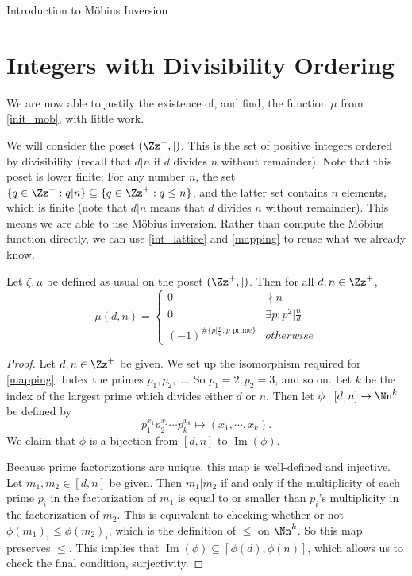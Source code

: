 \documentclass[12pt]{pom_thesis}
\DeclareMathOperator{\im}{Im}
\begin{document}
\begin{chapter}{Introduction to M\"obius Inversion}
\section{Integers with Divisibility Ordering}
We are now able to justify the existence of, and find, the function $\mu$ from \eqref{init_mob}, with little work.

We will consider the poset $(\Zz^{+}, |)$. This is the set of positive integers ordered by divisibility (recall that $d|n$ if $d$ divides $n$ without remainder). Note that this poset is lower finite: For any number $n$, the set $\{q \in \Zz^{+}: q|n\} \subseteq \{q \in \Zz^{+}: q \leq n\}$, and the latter set contains $n$ elements, which is finite (note that $d|n$ means that $d$ divides $n$ without remainder). This means we are able to use M\"obius inversion. Rather than compute the M\"obius function directly, we can use \ref{int_lattice} and \ref{mapping} to reuse what we already know.

\begin{thm}\label{mu_div}
Let $\zeta, \mu$ be defined as usual on the poset $(\Zz^+, |)$. Then for all $d,n \in \Zz^+$,
\[
\mu(d,n) =
\begin{cases}
0 & \nmid n \\
0 & \exists p: p^2|\frac nd\\
(-1)^{\#\{p|\frac nd : p \text{ prime}\}} & otherwise
\end{cases}
\]
\end{thm}

\begin{proof}
Let $d,n \in \Zz^+$ be given. We set up the isomorphism required for \ref{mapping}: Index the primes $p_1, p_2, \dots$. So $p_1=2, p_2=3$, and so on. Let $k$ be the index of the largest prime which divides either $d$ or $n$. Then let $\phi : [d,n] \rightarrow \Nn^k$ be defined by
\[
 p_1^{x_1}p_2^{x_2}\cdots p_k^{x_k} \mapsto (x_1, \cdots, x_k).
\]
We claim that $\phi$ is a bijection from $[d,n]$ to $\im(\phi)$.

Because prime factorizations are unique, this map is well-defined and injective. Let $m_1, m_2 \in [d,n]$ be given. Then $m_1|m_2$ if and only if the multiplicity of each prime $p_i$ in the factorization of $m_1$ is equal to or smaller than $p_i$'s multiplicity in the factorization of $m_2$. This is equivalent to checking whether or not $\phi(m_1)_i \leq \phi(m_2)_i$, which is the definition of $\leq$ on $\Nn^k$. So this map preserves $\leq$. This implies that $\im(\phi) \subseteq [\phi(d), \phi(n)]$, which allows us to check the final condition, surjectivity. 


\end{proof}
\end{chapter}
\end{document}
